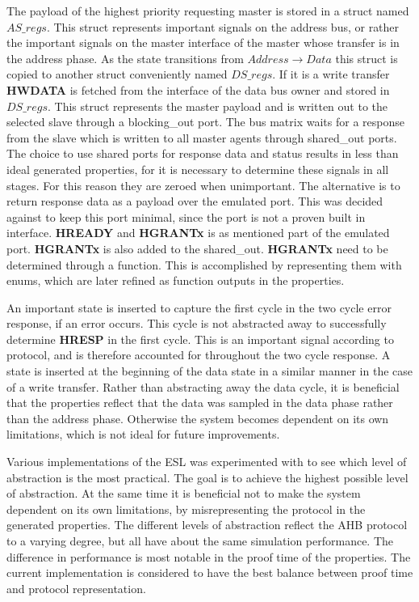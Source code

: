 The payload of the highest priority requesting master is stored in a struct named $AS\_regs$. This struct represents important signals on the address bus, or rather the important signals on the master interface of the master whose transfer is in the address phase. As the state transitions from $Address\rightarrow Data$ this struct is copied to another struct conveniently named $DS\_regs$. If it is a write transfer \textbf{HWDATA} is fetched from the interface of the data bus owner and stored in $DS\_regs$. This struct represents the master payload and is written out to the selected slave through a blocking\_out port. The bus matrix waits for a response from the slave which is written to all master agents through shared\_out ports. The choice to use shared ports for response data and status results in less than ideal generated properties, for it is necessary to determine these signals in all stages. For this reason they are zeroed when unimportant. The alternative is to return response data as a payload over the emulated port. This was decided against to keep this port minimal, since the port is not a proven built in interface. \textbf{HREADY} and \textbf{HGRANTx} is as mentioned part of the emulated port. \textbf{HGRANTx} is also added to the shared\_out. \textbf{HGRANTx} need to be determined through a function. This is accomplished by representing them with enums, which are later refined as function outputs in the properties. \par 
An important state is inserted to capture the first cycle in the two cycle error response, if an error occurs. This cycle is not abstracted away to successfully determine \textbf{HRESP} in the first cycle. This is an important signal according to protocol, and is therefore accounted for throughout the two cycle response. A state is inserted at the beginning of the data state in a similar manner in the case of a write transfer. Rather than abstracting away the data cycle, it is beneficial that the properties reflect that the data was sampled in the data phase rather than the address phase. Otherwise the system becomes dependent on its own limitations, which is not ideal for future improvements. \par
Various implementations of the ESL was experimented with to see which level of abstraction is the most practical. The goal is to achieve the highest possible level of abstraction. At the same time it is beneficial not to make the system dependent on its own limitations, by misrepresenting the protocol in the generated properties. The different levels of abstraction reflect the AHB protocol to a varying degree, but all have about the same simulation performance. The difference in performance is most notable in the proof time of the properties. The current implementation is considered to have the best balance between proof time and protocol representation.       


